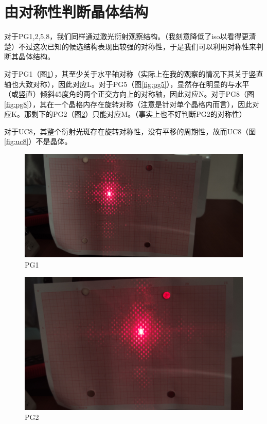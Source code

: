 \documentclass[fleqn,10pt]{SelfArx} %
\begin{document}
\section{由对称性判断晶体结构}
对于PG1,2,5,8，我们同样通过激光衍射观察结构。（我刻意降低了iso以看得更清楚）不过这次已知的候选结构表现出较强的对称性，于是我们可以利用对称性来判断其晶体结构。

对于PG1（图\ref{fig:pg1}），其至少关于水平轴对称（实际上在我的观察的情况下其关于竖直轴也大致对称），因此对应L。对于PG5（图\ref{fig:pg5}），显然存在明显的与水平（或竖直）倾斜45度角的两个正交方向上的对称轴，因此对应N。对于PG8（图\ref{fig:pg8}），其在一个晶格内存在旋转对称（注意是针对单个晶格内而言），因此对应K。那剩下的PG2（图\ref{fig:pg2}）只能对应M。（事实上也不好判断PG2的对称性）

对于UC8，其整个衍射光斑存在旋转对称性，没有平移的周期性，故而UC8（图\ref{fig:uc8}）不是晶体。
\begin{figure}[htbp]
\centering
	\includegraphics[width=\linewidth]{PG1.jpg}
	\caption{PG1}
	\label{fig:pg1}
\end{figure}
\begin{figure}[htbp]
\centering
	\includegraphics[width=\linewidth]{PG2.jpg}
	\caption{PG2}
	\label{fig:pg2}
\end{figure}
\end{document}
